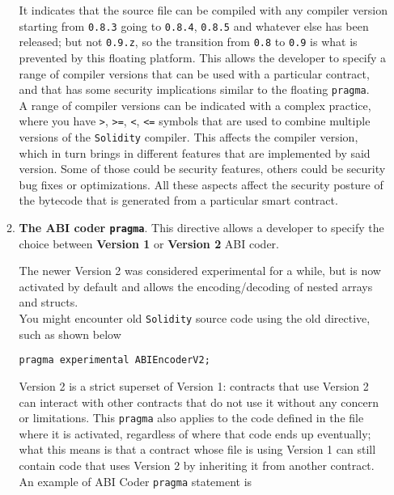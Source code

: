 \begin{enumerate}
\begin{enumerate}[label*=\arabic*.]
      It indicates that the source file can be compiled with any compiler version starting from \texttt{0.8.3} going to \texttt{0.8.4}, \texttt{0.8.5} and whatever else has been released; but not \texttt{0.9.z}, so the transition from \texttt{0.8} to \texttt{0.9} is what is prevented by this floating platform.
      This allows the developer to specify a range of compiler versions that can be used with a particular contract, and that has some security implications similar to the floating \texttt{pragma}.\\

      A range of compiler versions can be indicated with a complex practice, where you have \texttt{>}, \texttt{>=}, \texttt{<}, \texttt{<=} symbols that are used to combine multiple versions of the \texttt{Solidity} compiler.
      This affects the compiler version, which in turn brings in different features that are implemented by said version.
      Some of those could be security features, others could be security bug fixes or optimizations.
      All these aspects affect the security posture of the bytecode that is generated from a particular smart contract.
      
      \item\textbf{The ABI coder \texttt{pragma}}.
      This directive allows a developer to specify the choice between \textbf{Version 1} or \textbf{Version 2} ABI coder.

      The newer Version 2 was considered experimental for a while, but is now activated by default and allows the encoding/decoding of nested arrays and structs.\\
      
      You might encounter old \texttt{Solidity} source code using the old directive, such as shown below

      \begin{lstlisting}[language=Solidity, style=solStyle, caption={Example of old ABI coder \texttt{pragma} statement.}]
pragma experimental ABIEncoderV2;
      \end{lstlisting}

      Version 2 is a strict superset of Version 1: contracts that use Version 2 can interact with other contracts that do not use it without any concern or limitations.
      This \texttt{pragma} also applies to the code defined in the file where it is activated, regardless of where that code ends up eventually; what this means is that a contract whose file is using Version 1 can still contain code that uses Version 2 by inheriting it from another contract.
      An example of ABI Coder \texttt{pragma} statement is


\end{enumerate}
\end{enumerate}
